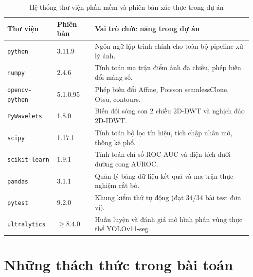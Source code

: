 \begin{table}[h]
\centering
\caption{Hệ thống thư viện phần mềm và phiên bản xác thực trong dự án}
\label{tab:libraries}
\begin{tabularx}{\textwidth}{l l X}
\toprule
\textbf{Thư viện} & \textbf{Phiên bản} & \textbf{Vai trò chức năng trong dự án} \\
\midrule
\texttt{python} & 3.11.9 & Ngôn ngữ lập trình chính cho toàn bộ pipeline xử lý ảnh. \\
\texttt{numpy} & 2.4.6 & Tính toán ma trận điểm ảnh đa chiều, phép biến đổi mảng số. \\
\texttt{opencv-python} & 5.1.0.95 & Phép biến đổi Affine, Poisson seamlessClone, Otsu, contours. \\
\texttt{PyWavelets} & 1.8.0 & Biến đổi sóng con 2 chiều 2D-DWT và nghịch đảo 2D-IDWT. \\
\texttt{scipy} & 1.17.1 & Tính toán bộ lọc tín hiệu, tích chập nhân mờ, thống kê phổ. \\
\texttt{scikit-learn} & 1.9.1 & Tính toán chỉ số ROC-AUC và diện tích dưới đường cong AUROC. \\
\texttt{pandas} & 3.1.1 & Quản lý bảng dữ liệu kết quả và ma trận thực nghiệm cắt bỏ. \\
\texttt{pytest} & 9.2.0 & Khung kiểm thử tự động (đạt 34/34 bài test đơn vị). \\
\texttt{ultralytics} & $\ge 8.4.0$ & Huấn luyện và đánh giá mô hình phân vùng thực thể YOLOv11-seg. \\
\bottomrule
\end{tabularx}
\end{table}

\section{Những thách thức trong bài toán}

